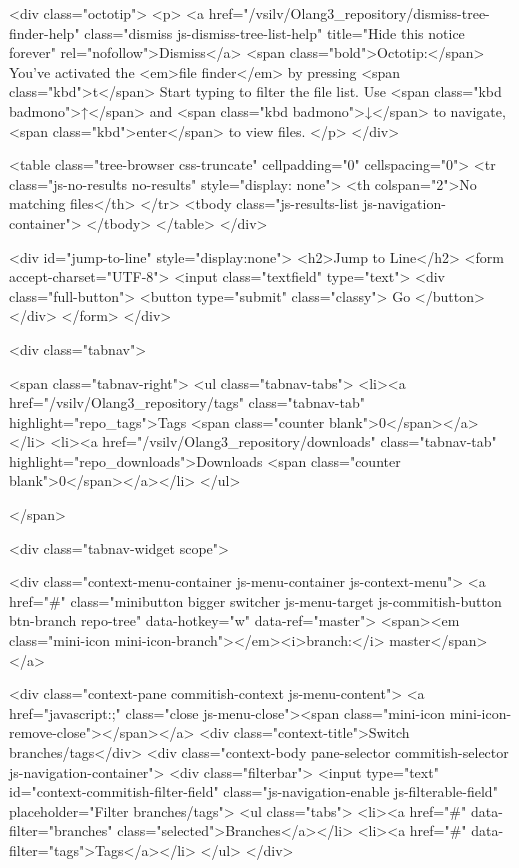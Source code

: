     <div class="octotip">
      <p>
        <a href="/vsilv/Olang3_repository/dismiss-tree-finder-help" class="dismiss js-dismiss-tree-list-help" title="Hide this notice forever" rel="nofollow">Dismiss</a>
        <span class="bold">Octotip:</span> You've activated the <em>file finder</em>
        by pressing <span class="kbd">t</span> Start typing to filter the
        file list. Use <span class="kbd badmono">↑</span> and
        <span class="kbd badmono">↓</span> to navigate,
        <span class="kbd">enter</span> to view files.
      </p>
    </div>

  <table class="tree-browser css-truncate" cellpadding="0" cellspacing="0">
    <tr class="js-no-results no-results" style="display: none">
      <th colspan="2">No matching files</th>
    </tr>
    <tbody class="js-results-list js-navigation-container">
    </tbody>
  </table>
</div>

<div id="jump-to-line" style="display:none">
  <h2>Jump to Line</h2>
  <form accept-charset="UTF-8">
    <input class="textfield" type="text">
    <div class="full-button">
      <button type="submit" class="classy">
        Go
      </button>
    </div>
  </form>
</div>


<div class="tabnav">

  <span class="tabnav-right">
    <ul class="tabnav-tabs">
      <li><a href="/vsilv/Olang3_repository/tags" class="tabnav-tab" highlight="repo_tags">Tags <span class="counter blank">0</span></a></li>
      <li><a href="/vsilv/Olang3_repository/downloads" class="tabnav-tab" highlight="repo_downloads">Downloads <span class="counter blank">0</span></a></li>
    </ul>
    
  </span>

  <div class="tabnav-widget scope">


    <div class="context-menu-container js-menu-container js-context-menu">
      <a href="#"
         class="minibutton bigger switcher js-menu-target js-commitish-button btn-branch repo-tree"
         data-hotkey="w"
         data-ref="master">
         <span><em class="mini-icon mini-icon-branch"></em><i>branch:</i> master</span>
      </a>

      <div class="context-pane commitish-context js-menu-content">
        <a href="javascript:;" class="close js-menu-close"><span class="mini-icon mini-icon-remove-close"></span></a>
        <div class="context-title">Switch branches/tags</div>
        <div class="context-body pane-selector commitish-selector js-navigation-container">
          <div class="filterbar">
            <input type="text" id="context-commitish-filter-field" class="js-navigation-enable js-filterable-field" placeholder="Filter branches/tags">
            <ul class="tabs">
              <li><a href="#" data-filter="branches" class="selected">Branches</a></li>
                <li><a href="#" data-filter="tags">Tags</a></li>
            </ul>
          </div>

